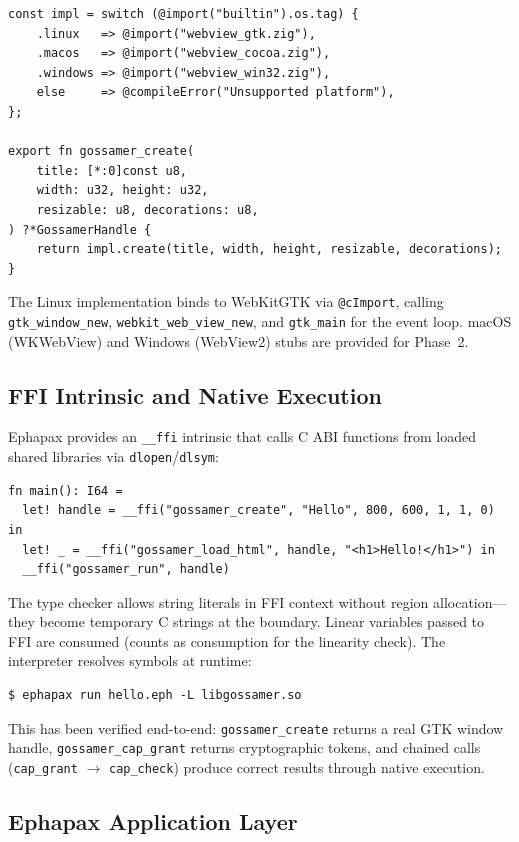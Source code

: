 \documentclass[11pt,a4paper]{article}
\theoremstyle{definition}
\begin{document}
\begin{lstlisting}[style=zig]
const impl = switch (@import("builtin").os.tag) {
    .linux   => @import("webview_gtk.zig"),
    .macos   => @import("webview_cocoa.zig"),
    .windows => @import("webview_win32.zig"),
    else     => @compileError("Unsupported platform"),
};

export fn gossamer_create(
    title: [*:0]const u8,
    width: u32, height: u32,
    resizable: u8, decorations: u8,
) ?*GossamerHandle {
    return impl.create(title, width, height, resizable, decorations);
}
\end{lstlisting}

The Linux implementation binds to WebKitGTK via \texttt{@cImport},
calling \texttt{gtk\_window\_new}, \texttt{webkit\_web\_view\_new},
and \texttt{gtk\_main} for the event loop. macOS (WKWebView) and
Windows (WebView2) stubs are provided for Phase~2.

\subsection{FFI Intrinsic and Native Execution}

Ephapax provides an \texttt{\_\_ffi} intrinsic that calls C ABI
functions from loaded shared libraries via \texttt{dlopen}/\texttt{dlsym}:

\begin{lstlisting}[style=ephapax]
fn main(): I64 =
  let! handle = __ffi("gossamer_create", "Hello", 800, 600, 1, 1, 0) in
  let! _ = __ffi("gossamer_load_html", handle, "<h1>Hello!</h1>") in
  __ffi("gossamer_run", handle)
\end{lstlisting}

The type checker allows string literals in FFI context without region
allocation---they become temporary C strings at the boundary. Linear
variables passed to FFI are consumed (counts as consumption for the
linearity check). The interpreter resolves symbols at runtime:

\begin{verbatim}
$ ephapax run hello.eph -L libgossamer.so
\end{verbatim}

This has been verified end-to-end: \texttt{gossamer\_create} returns a
real GTK window handle, \texttt{gossamer\_cap\_grant} returns
cryptographic tokens, and chained calls (\texttt{cap\_grant} $\to$
\texttt{cap\_check}) produce correct results through native execution.

\subsection{Ephapax Application Layer}
\end{document}

